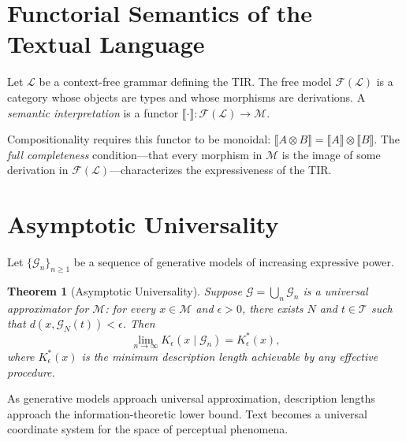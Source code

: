 \documentclass[11pt,a4paper]{article}
\newtheorem{theorem}{Theorem}[section]
\theoremstyle{definition}
\theoremstyle{remark}
\begin{document}
\section{Functorial Semantics of the Textual Language}
\label{app:functorial}

Let $\mathcal{L}$ be a context-free grammar defining the TIR. The free model $\mathcal{F}(\mathcal{L})$ is a category whose objects are types and whose morphisms are derivations. A \emph{semantic interpretation} is a functor $\llbracket \cdot \rrbracket : \mathcal{F}(\mathcal{L}) \to \mathcal{M}$.

Compositionality requires this functor to be monoidal: $\llbracket A \otimes B \rrbracket = \llbracket A \rrbracket \otimes \llbracket B \rrbracket$. The \emph{full completeness} condition---that every morphism in $\mathcal{M}$ is the image of some derivation in $\mathcal{F}(\mathcal{L})$---characterizes the expressiveness of the TIR.

\section{Asymptotic Universality}
\label{app:universality}

Let $\{\mathcal{G}_n\}_{n \ge 1}$ be a sequence of generative models of increasing expressive power.

\begin{theorem}[Asymptotic Universality]
Suppose $\mathcal{G} = \bigcup_n \mathcal{G}_n$ is a universal approximator for $\mathcal{M}$: for every $x \in \mathcal{M}$ and $\epsilon > 0$, there exists $N$ and $t \in \mathcal{T}$ such that $d(x, \mathcal{G}_N(t)) < \epsilon$. Then
\[
\lim_{n \to \infty} K_\epsilon(x \mid \mathcal{G}_n) = K_\epsilon^*(x),
\]
where $K_\epsilon^*(x)$ is the minimum description length achievable by any effective procedure.
\end{theorem}

As generative models approach universal approximation, description lengths approach the information-theoretic lower bound. Text becomes a universal coordinate system for the space of perceptual phenomena.
\end{document}
